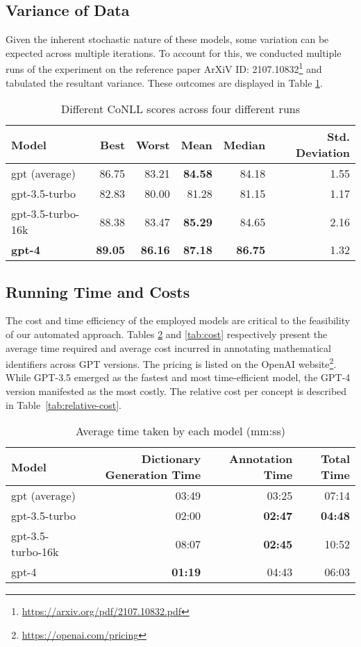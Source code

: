 \subsection{Variance of Data}
Given the inherent stochastic nature of these models, some variation can be expected across multiple iterations. To account for this, we conducted multiple runs of the experiment on the reference paper ArXiV ID: 2107.10832\footnote{\url{https://arxiv.org/pdf/2107.10832.pdf}} \citep{singleton2021logic} and tabulated the resultant variance. These outcomes are displayed in Table \ref{tab:variance}.

\begin{table}[htpb]
  \centering
  \begin{tabular}{lrrrrr}
    \hline
    Model & Best & Worst & Mean & Median & Std. Deviation \\
    \hline
    gpt (average) & 86.75 & 83.21 & \textbf{84.58} & 84.18 & 1.55 \\
    gpt-3.5-turbo & 82.83 & 80.00 & 81.28 & 81.15 & 1.17 \\
    gpt-3.5-turbo-16k & 88.38 & 83.47 & \textbf{85.29} & 84.65 & 2.16 \\
    \textbf{gpt-4} & \textbf{89.05} & \textbf{86.16} & \textbf{87.18} & \textbf{86.75} & 1.32 \\
    \hline
  \end{tabular}
  \caption[Statistics of variance]{Different CoNLL scores across four different runs}
  \label{tab:variance}
\end{table}

\subsection{Running Time and Costs}

The cost and time efficiency of the employed models are critical to the feasibility of our automated approach. Tables \ref{tab:time} and \ref{tab:cost} respectively present the average time required and average cost incurred in annotating mathematical identifiers across GPT versions. The pricing is listed on the OpenAI website\footnote{\url{https://openai.com/pricing}}. While GPT-3.5 emerged as the fastest and most time-efficient model, the GPT-4 version manifested as the most costly. The relative cost per concept is described in Table~\ref{tab:relative-cost}.

\begin{table}[htpb]
  \centering
  \begin{tabular}{lrrr}
    \hline
    Model & Dictionary Generation Time & Annotation Time & Total Time \\
    \hline
    gpt (average) & 03:49 & 03:25 & 07:14 \\
    gpt-3.5-turbo & 02:00 & \textbf{02:47} & \textbf{04:48} \\
    gpt-3.5-turbo-16k & 08:07 & \textbf{02:45} & 10:52 \\
    gpt-4 & \textbf{01:19} & 04:43 & 06:03 \\
    \hline
  \end{tabular}
  \caption[Average time taken]{Average time taken by each model (mm:ss)}
  \label{tab:time}
\end{table}

